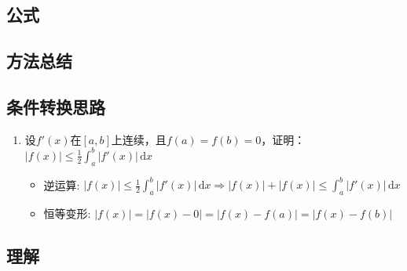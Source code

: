 \documentclass[a4paper,12pt]{article}
\begin{document}
    \subsection{公式}

    \begin{enumerate}

    \end{enumerate}

    \subsection{方法总结}

    \begin{enumerate}

    \end{enumerate}

    \subsection{条件转换思路}

    \begin{enumerate}
        \item 设$f'(x)$在$[a, b]$上连续，且$f(a) = f(b) = 0$，证明：$|f(x)| \leq \displaystyle\frac{1}{2}\int_a^b |f'(x)|\,\mathrm{d}x$
        \begin{itemize}
            \item 逆运算: $|f(x)| \leq \displaystyle\frac{1}{2}\int_a^b |f'(x)|\,\mathrm{d}x \Rightarrow |f(x)| + |f(x)| \leq \displaystyle\int_a^b |f'(x)|\,\mathrm{d}x$
            \item 恒等变形: $|f(x)| = |f(x) - 0| = |f(x) - f(a)| = |f(x) - f(b)|$
        \end{itemize}
    \end{enumerate}

    \subsection{理解}
\end{document}
